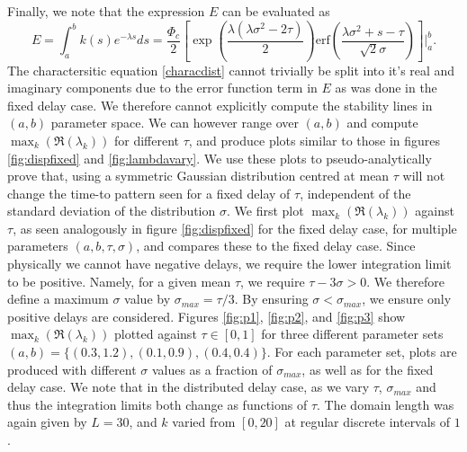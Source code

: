 \documentclass[12pt]{report}
\begin{document}
Finally, we note that the expression $E$ can be evaluated as
\begin{equation}
E=\int_a^bk(s)e^{-\lambda s}ds=\frac{\Phi_c}{2}\left[\exp\left(\frac{\lambda(\lambda\sigma^2-2\tau)}{2}\right) \text{erf} \left(\frac{\lambda\sigma^2+s-\tau}{\sqrt{2}\sigma}\right)\right]\Bigg|_a^b.
\end{equation}
The charactersitic equation \eqref{characdist} cannot trivially be split into it's real and imaginary components due to the error function term in $E$ as was done in the fixed delay case. We therefore cannot explicitly compute the stability lines in $(a,b)$ parameter space. We can however range over $(a,b)$ and compute $\max_k(\Re(\lambda_k))$ for different $\tau$, and produce plots similar to those in figures \ref{fig:dispfixed} and \ref{fig:lambdavary}. We use these plots to pseudo-analytically prove that, using a symmetric Gaussian distribution centred at mean $\tau$ will not change the time-to pattern seen for a fixed delay of $\tau$, independent of the standard deviation of the distribution $\sigma$. We first plot $\max_k(\Re(\lambda_k))$ against $\tau$, as seen analogously in figure \ref{fig:dispfixed} for the fixed delay case, for multiple parameters $(a,b,\tau,\sigma)$, and compares these to the fixed delay case. Since physically we cannot have negative delays, we require the lower integration limit to be positive. Namely, for a given mean $\tau$, we require $\tau-3\sigma>0$. We therefore define a maximum $\sigma$ value by $\sigma_{max}=\tau / 3$. By ensuring $\sigma<\sigma_{max}$, we ensure only positive delays are considered. Figures \ref{fig:p1}, \ref{fig:p2}, and \ref{fig:p3} show $\max_k(\Re(\lambda_k))$ plotted against $\tau\in[0,1]$ for three different parameter sets $(a,b)=\{(0.3,1.2), (0.1,0.9), (0.4,0.4)\}$. For each parameter set, plots are produced with different $\sigma$ values as a fraction of $\sigma_{max}$, as well as for the fixed delay case. We note that in the distributed delay case, as we vary $\tau$, $\sigma_{max}$ and thus the integration limits both change as functions of $\tau$. The domain length was again given by $L=30$, and $k$ varied from $[0,20]$ at regular discrete intervals of $1$.
\end{document}
